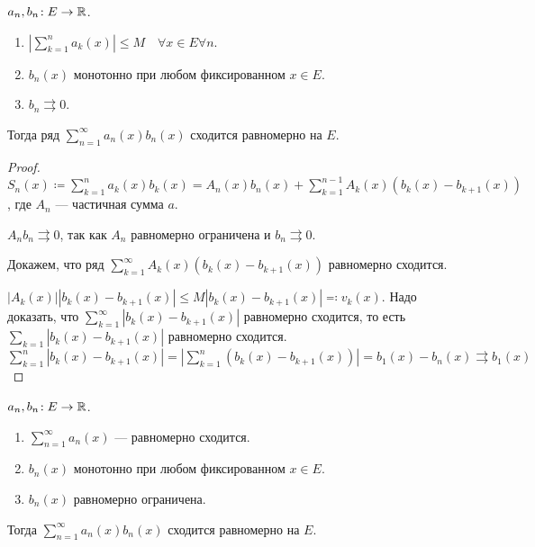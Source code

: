 \begin{theorem}
    $a_n, b_n\!: E \to \mathbb{R}$.
     \begin{enumerate}
         \item $\left|\sum\limits_{k=1}^n a_k(x)\right| \le M \quad \forall x \in E \forall n$.
         \item $b_n(x)$ монотонно при любом фиксированном $x \in E$.
         \item  $b_n \rightrightarrows 0$.
    \end{enumerate}

    Тогда ряд $\sum\limits_{n=1}^\infty a_n(x)b_n(x)$ сходится равномерно на  $E$.
\end{theorem}
\begin{proof}
   $S_n(x) \coloneqq \sum\limits_{k=1}^n a_k(x)b_k(x) = A_n(x)b_n(x) + \sum\limits_{k=1}^{n-1}A_k(x)(b_k(x) - b_{k+1}(x))$, где $A_n$ --- частичная сумма  $a$.

   $A_nb_n \rightrightarrows 0$, так как  $A_n$ равномерно ограничена и  $b_n \rightrightarrows 0$.

   Докажем, что ряд $\sum\limits_{k=1}^\infty A_k(x)(b_k(x) - b_{k+1}(x))$ равномерно сходится.

   $|A_k(x)| |b_k(x) - b_{k+1}(x)| \le M|b_k(x) - b_{k+1}(x)| \eqqcolon v_k(x)$. Надо доказать, что $\sum\limits_{k=1}^\infty |b_k(x) - b_{k+1}(x)|$ равномерно сходится, то есть  $\sum\limits_{k=1} |b_k(x) - b_{k+1}(x)|$ равномерно сходится. $\sum\limits_{k=1}^n |b_k(x) - b_{k+1}(x)| = |\sum\limits_{k=1}^n (b_k(x) - b_{k+1}(x))| = b_1(x) - b_n(x) \rightrightarrows b_1(x)$
\end{proof}
\begin{theorem}
    $a_n, b_n\!: E \to \mathbb{R}$.
     \begin{enumerate}
         \item $\sum\limits_{n=1}^\infty a_n(x)$ --- равномерно сходится.
         \item  $b_n(x)$ монотонно при любом фиксированном  $x \in E$.
         \item  $b_n(x)$ равномерно ограничена.
    \end{enumerate}

    Тогда $\sum\limits_{n=1}^\infty a_n(x)b_n(x)$ сходится равномерно на  $E$.
\end{theorem}
